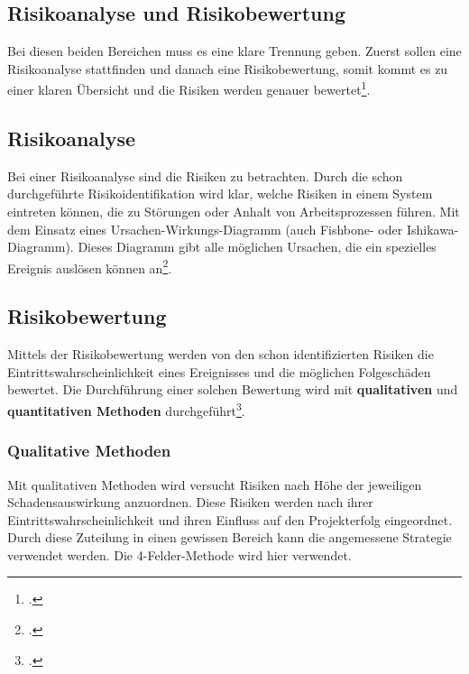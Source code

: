 \subsection{Risikoanalyse und Risikobewertung}
Bei diesen beiden Bereichen muss es eine klare Trennung geben. Zuerst sollen eine Risikoanalyse stattfinden und danach eine Risikobewertung, somit kommt es zu einer klaren Übersicht und die Risiken werden genauer bewertet\footcite{risikoanalyse}.


\subsection{Risikoanalyse}
Bei einer Risikoanalyse sind die Risiken zu betrachten. Durch die schon durchgeführte Risikoidentifikation wird klar, welche Risiken in einem System eintreten können, die zu Störungen oder Anhalt von Arbeitsprozessen führen. Mit dem Einsatz eines Ursachen-Wirkungs-Diagramm (auch Fishbone- oder Ishikawa-Diagramm). Dieses Diagramm gibt alle möglichen Ursachen, die ein spezielles Ereignis auslösen können an\footcite{risikomanagement-diplomarbeit}.


\subsection{Risikobewertung}
Mittels der Risikobewertung werden von den schon identifizierten Risiken die Eintrittswahrscheinlichkeit eines Ereignisses und die möglichen Folgeschäden bewertet. Die Durchführung einer solchen Bewertung wird mit \textbf{qualitativen} und \textbf{quantitativen Methoden} durchgeführt\footcite{risikomanagement-diplomarbeit}.

\subsubsection{Qualitative Methoden}
Mit qualitativen Methoden wird versucht Risiken nach Höhe der jeweiligen Schadensauswirkung anzuordnen.
Diese Risiken werden nach ihrer Eintrittswahrscheinlichkeit und ihren Einfluss auf den Projekterfolg eingeordnet. Durch diese Zuteilung in einen gewissen Bereich kann die angemessene Strategie verwendet werden. Die 4-Felder-Methode wird hier verwendet.

